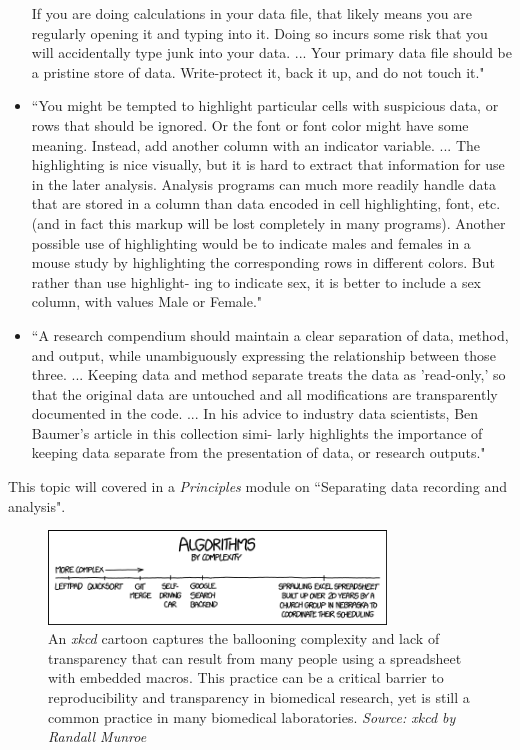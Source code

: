 \documentclass[pdftex,english,11pt,parskip=half]{scrartcl}
\begin{document}
\begin{itemize}
If you are doing calculations in your data file, that likely means you are regularly opening it and typing into it. Doing so incurs some risk that you will accidentally type junk into your data. ... Your primary data file should be a pristine store of data. Write-protect it, back it up, and do not touch it." \cite{broman2018data} 
\item ``You might be tempted to highlight particular cells with suspicious data, or rows that should be ignored. Or the font or font color might have some meaning. Instead, add another column with an indicator variable. ... The highlighting is nice visually, but it is hard to extract that information for use in the later analysis. Analysis programs can much more readily handle data that are stored in a column than data encoded in cell highlighting, font, etc. (and in fact this markup will be lost completely in many programs). Another possible use of highlighting would be to indicate males and females in a mouse study by highlighting the corresponding rows in different colors. But rather than use highlight- ing to indicate sex, it is better to include a sex column, with values Male or Female." \cite{broman2018data}
\item ``A research compendium should maintain a clear separation of data, method, and output, while unambiguously expressing the relationship between those three. ... Keeping data and method separate treats the data as 'read-only,' so that the original data are untouched and all modifications are transparently documented in the code. ... In his advice to industry data scientists, Ben Baumer's article in this collection simi- larly highlights the importance of keeping data separate from the presentation of data, or research outputs." \cite{marwick2018packaging}
\end{itemize}

This topic will covered in a \textit{Principles} module on ``Separating data
recording and analysis".

\begin{figure}[b] \centering \includegraphics[width =
0.8\textwidth]{figures/algorithms.png} \caption{An \textit{xkcd} cartoon
captures the ballooning complexity and lack of transparency that can result from
many people using a spreadsheet with embedded macros. This practice can be a
critical barrier to reproducibility and transparency in biomedical research, yet
is still a common practice in many biomedical laboratories. \textit{Source: xkcd
by Randall Munroe}} \label{fig:spreadsheet} \end{figure}
\end{document}

